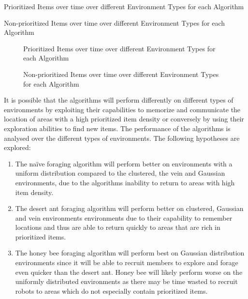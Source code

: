 \begin{table} [h]
     \caption{Prioritized Items over time over different Environment Types for each Algorithm}
     \label{environmenttypeprioritized}
	\centering
	\footnotesize
	
\end{table}

\begin{table} [h]
     \caption{Non-prioritized Items over time over different Environment Types for each Algorithm}
     \label{environmenttypenonprioritized}
	\centering
	\footnotesize
	
\end{table}

\begin{figure}[!htb]
\centering
\resizebox{0.8\textwidth}{!}{}
\caption{Prioritized Items over time over different Environment Types for each Algorithm}
\label{fig:environmenttypes}
\end{figure}


\begin{figure}[!htb]
\centering
\resizebox{0.8\textwidth}{!}{}
\caption{Non-prioritized Items over time over different Environment Types for each Algorithm}
\label{fig:environmenttypesnonprioritized}
\end{figure}

It is possible that the algorithms will perform differently on different types of environments by exploiting their capabilities to memorize and communicate the location of areas with a high prioritized item density or conversely by using their exploration abilities to find new items. The performance of the algorithms is analysed over the different types of environments. The following hypotheses are explored:  

\begin{enumerate}
	\item The na\"ive foraging algorithm will perform better on environments with a uniform distribution compared to the clustered, the vein and Gaussian environments, due to the algorithms inability to return to areas with high item density. 
	\item The desert ant foraging algorithm will perform better on clustered, Gaussian and vein environments environments due to their capability to remember locations and thus are able to return quickly to areas that are rich in prioritized items.
	 \item The honey bee foraging algorithm will perform best on Gaussian distribution environments since it will be able to recruit members to explore and forage even quicker than the desert ant. Honey bee will likely perform worse on the uniformly distributed environments as there may be time wasted to recruit robots to areas which do not especially contain prioritized items.
\end{enumerate}

